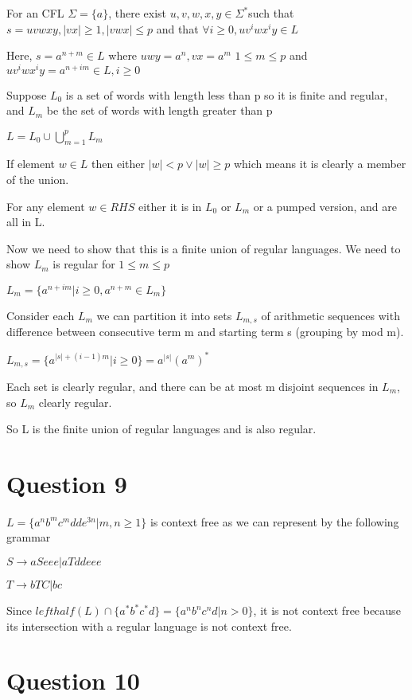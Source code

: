\documentclass[a4paper, 11pt]{article}
\begin{document}
For an CFL $\Sigma=\{a\}$, there exist  $u,v,w,x,y \in \Sigma^* $such that $s=uvwxy, |vx|\geq 1, |vwx|\leq p$ and that $\forall i \geq 0, uv^iwx^iy \in L$ 

Here, $s= a^{n+m} \in L$ where $uwy=a^n,vx=a^m$ $1 \leq m\leq p$ and $uv^iwx^iy=a^{n+im} \in L, i\geq 0$

Suppose $L_0$ is a set of words with length less than p so it is finite and regular, and $L_m$ be the set of words with length greater than p 

$L=L_0 \cup \bigcup_{m=1}^{p}L_m$

If element $w \in L$ then either $|w|<p \lor |w| \geq p$ which means it is clearly a member of the union.

For any element $w \in RHS$ either it is in $L_0$ or $L_m$ or a pumped version, and are all in L.

Now we need to show that this is a finite union of regular languages. We need to show $L_m$ is regular for $1 \leq m\leq p$

$L_m =\{a^{n+im}| i \geq 0,a^{n+m} \in L_m\}$

Consider each $L_m$ we can partition it into sets $L_{m,s}$ of arithmetic sequences with difference between consecutive term m and starting term s (grouping by mod m).

$L_{m,s}=\{a^{|s|+(i-1)m}|i\geq 0\} = a^{|s|}(a^m)^*$

Each set is clearly regular, and there can be at most m disjoint sequences in $L_m$, so $L_m$ clearly regular.

So L is the finite union of regular languages and is also regular.



\section*{Question 9}
$L= \{a^nb^mc^mdde^{3n} | m,n \geq 1\}$ is context free as we can represent by the following grammar

$S\rightarrow aSeee|aTddeee$

$T\rightarrow bTC | bc$

Since $lefthalf(L) \cap \{a^*b^*c^*d\} = \{a^nb^nc^nd|n>0\}$, it is not context free because its intersection with a regular language is not context free.

\section*{Question 10}
\end{document}
